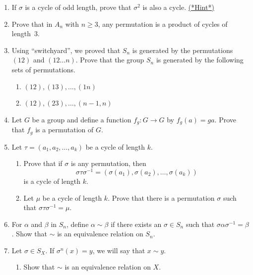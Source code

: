 \begin{enumerate}
\item \label{ex:permute:Ad4}
If $\sigma$ is a cycle of odd length, prove that $\sigma^2$ is also a
cycle.
\hyperref[sec:permute:hints]{(*Hint*)}  
  
\item
Prove that in $A_n$ with $n \geq 3$, any permutation is a product of
cycles of length~3.  
  
\item
Using ``switchyard'', we proved that $S_n$ is generated by the permutations $(12)$ and $(12 \ldots n)$.
Prove that the group $S_n$ is generated by
the following sets of permutations.
\begin{enumerate}
 
 \item
$(1 2), (13), \ldots, (1n)$
 
 \item
$(1 2), (23), \ldots, (n- 1,n)$
 
 
\end{enumerate}
 
 
\item
Let $G$ be a group and define a function $f_g : G \rightarrow G$ by
$f_g(a) = g a$.  Prove that $f_g$ is a permutation of $G$.
 
 
 \item
Let $\tau = (a_1, a_2, \ldots, a_k)$ be a cycle of length $k$.
\begin{enumerate}
 
 \item
Prove that if $\sigma$ is any permutation, then
\[
\sigma \tau \sigma^{-1 } = ( \sigma(a_1), \sigma(a_2), \ldots,
\sigma(a_k))
\]
is a cycle of length $k$.
 
 \item
Let $\mu$ be a cycle of length $k$. Prove that there is a permutation
$\sigma$ such that $\sigma \tau \sigma^{-1 } = \mu$.
 
\end{enumerate}
 
 
\item
For $\alpha$ and $\beta$ in $S_n$, define $\alpha \sim \beta$ if there
exists an $\sigma \in S_n$ such that $\sigma \alpha \sigma^{-1} =
\beta$.  Show that $\sim$ is an equivalence relation on $S_n$.
 
 
\item
Let $\sigma \in S_X$. If $\sigma^n(x) = y$, we will say that $x \sim
y$. 
\begin{enumerate}
 
 \item
Show that $\sim$ is an equivalence relation on $X$.
 

\end{enumerate}
\end{enumerate}
